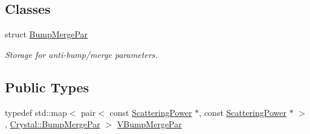 \subsection*{Classes}
\begin{DoxyCompactItemize}
\item 
struct \mbox{\hyperlink{struct_obj_cryst_1_1_crystal_1_1_bump_merge_par}{Bump\+Merge\+Par}}
\begin{DoxyCompactList}\small\item\em Storage for anti-\/bump/merge parameters. \end{DoxyCompactList}\end{DoxyCompactItemize}
\subsection*{Public Types}
\begin{DoxyCompactItemize}
\item 
typedef std\+::map$<$ pair$<$ const \mbox{\hyperlink{class_obj_cryst_1_1_scattering_power}{Scattering\+Power}} $\ast$, const \mbox{\hyperlink{class_obj_cryst_1_1_scattering_power}{Scattering\+Power}} $\ast$ $>$, \mbox{\hyperlink{struct_obj_cryst_1_1_crystal_1_1_bump_merge_par}{Crystal\+::\+Bump\+Merge\+Par}} $>$ \mbox{\hyperlink{class_obj_cryst_1_1_crystal_af57b44b799f164dbc86227f555a5eee5}{V\+Bump\+Merge\+Par}}
\end{DoxyCompactItemize}

